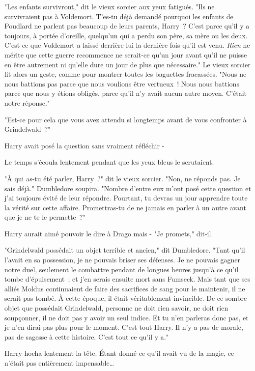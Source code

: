 "Les enfants survivront," dit le vieux sorcier aux yeux fatigués. "Ils ne survivraient pas à Voldemort. T'es-tu déjà demandé pourquoi les enfants de Poudlard ne parlent pas beaucoup de leurs parents, Harry~? C'est parce qu'il y a toujours, à portée d'oreille, quelqu'un qui a perdu son père, sa mère ou les deux. C'est ce que Voldemort a laissé derrière lui la dernière fois qu'il est venu. \emph{Rien} ne mérite que cette guerre recommence ne serait-ce qu'un jour avant qu'il ne puisse en être autrement ni qu'elle dure un jour de plus que nécessaire." Le vieux sorcier fit alors un geste, comme pour montrer toutes les baguettes fracassées. "Nous ne nous battions pas parce que nous voulions être vertueux~! Nous nous battions parce que nous y étions obligés, parce qu'il n'y avait aucun autre moyen. C'était notre réponse."

"Est-ce pour cela que vous avez attendu si longtemps avant de vous confronter à Grindelwald~?"

Harry avait posé la question sans vraiment réfléchir -

Le temps s'écoula lentement pendant que les yeux bleus le scrutaient.

"À qui as-tu été parler, Harry~?" dit le vieux sorcier. "Non, ne réponds pas. Je sais déjà." Dumbledore soupira. "Nombre d'entre eux m'ont posé cette question et j'ai toujours évité de leur répondre. Pourtant, tu devras un jour apprendre toute la vérité sur cette affaire. Promettras-tu de ne jamais en parler à un autre avant que je ne te le permette~?"

Harry aurait aimé pouvoir le dire à Drago mais - "Je promets," dit-il.

"Grindelwald possédait un objet terrible et ancien," dit Dumbledore. "Tant qu'il l'avait en sa possession, je ne pouvais briser ses défenses. Je ne pouvais gagner notre duel, seulement le combattre pendant de longues heures jusqu'à ce qu'il tombe d'épuisement~; et j'en serais ensuite mort sans Fumseck. Mais tant que ses alliés Moldus continuaient de faire des sacrifices de sang pour le maintenir, il ne serait pas tombé. À cette époque, il était véritablement invincible. De ce sombre objet que possédait Grindelwald, personne ne doit rien savoir, ne doit rien soupçonner, il ne doit pas y avoir un seul indice. Et tu n'en parleras donc pas, et je n'en dirai pas plus pour le moment. C'est tout Harry. Il n'y a pas de morale, pas de sagesse à cette histoire. C'est tout ce qu'il y a."

Harry hocha lentement la tête. Étant donné ce qu'il avait vu de la magie, ce n'était pas entièrement impensable…

